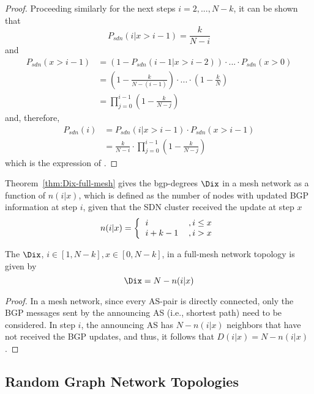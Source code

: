 \begin{proof}
Proceeding similarly for the next steps $i=2,...,N-k$, it can be shown that
\begin{equation}
P_{sdn}(i|x>i-1) = \frac{k}{N-i}
\end{equation}
and
\begin{align}
P_{sdn}(x>i-1) 	&= \left(1-P_{sdn}(i-1|x>i-2)\right)\cdot ... \cdot P_{sdn}(x>0) \nonumber\\
				& = \left(1-\frac{k}{N-(i-1)}\right)\cdot...\cdot  \left(1-\frac{k}{N}\right) \nonumber\\
				& = \prod_{j=0}^{i-1}\left(1-\frac{k}{N-j}\right)
\end{align}
and, therefore,
\begin{align}
P_{sdn}(i) &= P_{sdn}(i|x>i-1)\cdot P_{sdn}(x>i-1)\nonumber\\
				&= \frac{k}{N-i}\cdot \prod_{j=0}^{i-1}\left(1-\frac{k}{N-j}\right)
\end{align}
which is the expression of .
\end{proof}


Theorem~\ref{thm:Dix-full-mesh} gives the bgp-degrees $\Dix$ in a mesh network as a function of $n(i|x)$, which is defined as the number of nodes with updated BGP information at step $i$, given that the SDN cluster received the update at step $x$
\begin{equation}
n(i|x) = \left\{
\begin{tabular}{ll}
$i$	& $, i\leq x$ \\
$i+k-1$	& $, i>x$
\end{tabular}
\right.
\end{equation}


\begin{theorem}\label{thm:Dix-full-mesh}
The \bgp $\Dix$, $i\in[1,N-k], x\in[0,N-k]$, in a full-mesh network topology is given by
\begin{equation}
\Dix = N-n(i|x)
\end{equation}
\end{theorem}
\begin{proof}
In a mesh network, since every AS-pair is directly connected, only the BGP messages sent by the announcing AS (i.e., shortest path) need to be considered. In step $i$, the announcing AS has $N-n(i|x)$ neighbors that have not received the BGP updates, and thus, it follows that $D(i|x) = N-n(i|x)$.
\end{proof}



\subsection{Random Graph Network Topologies}


